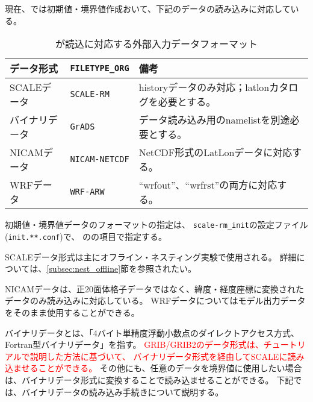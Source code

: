 \section{\SecAdvanceInputDataSetting} \label{sec:adv_datainput}

現在、\scalerm では初期値・境界値作成おいて、下記のデータの読み込みに対応している。

\begin{table}[htb]
\begin{center}
\caption{\scalelib が読込に対応する外部入力データフォーマット}
\begin{tabularx}{150mm}{|l|l|X|} \hline
 \rowcolor[gray]{0.9} データ形式      & \verb|FILETYPE_ORG|  & 備考 \\ \hline
 SCALEデータ    & \verb|SCALE-RM|     & historyデータのみ対応；latlonカタログを必要とする。 \\ \hline
 バイナリデータ & \verb|GrADS|        & データ読み込み用のnamelistを別途必要とする。 \\ \hline
 NICAMデータ    & \verb|NICAM-NETCDF| & NetCDF形式のLatLonデータに対応する。 \\ \hline
 WRFデータ      & \verb|WRF-ARW|      & ``wrfout''、``wrfrst''の両方に対応する。 \\ \hline
\end{tabularx}
\label{tab:inputdata_format}
\end{center}
\end{table}


初期値・境界値データのフォーマットの指定は、
\verb|scale-rm_init|の設定ファイル(\verb|init.**.conf|)で、
のの項目で指定する。

SCALEデータ形式は主にオフライン・ネスティング実験で使用される。
詳細については、\ref{subsec:nest_offline}節を参照されたい。

NICAMデータは、正20面体格子データではなく、緯度・経度座標に変換されたデータのみ読み込みに対応している。
WRFデータについてはモデル出力データをそのまま使用することができる。

バイナリデータとは、「4バイト単精度浮動小数点のダイレクトアクセス方式、Fortran型バイナリデータ」を指す。
\textcolor{red}{GRIB/GRIB2のデータ形式は、チュートリアルで説明した方法に基づいて、
バイナリデータ形式を経由してSCALEに読み込ませることができる。}
その他にも、任意のデータを境界値に使用したい場合は、バイナリデータ形式に変換することで読み込ませることができる。
下記では、バイナリデータの読み込み手続きについて説明する。

